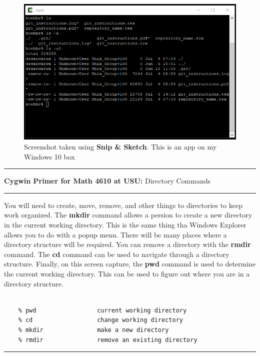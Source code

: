 \documentclass[10pt,fleqn]{article}
\begin{document}
\begin{figure}[h]
\centering
\includegraphics{./images/cygwin_02.png}
\caption{{Screenshot} taken using {\bf Snip \& Sketch}. This is an app on
         my Windows 10 box}
\end{figure}
\eject
\vskip0.1in\hrule\vskip0.1in
\noindent
{{\bf Cygwin Primer for Math 4610 at USU:} Directory Commands} 
\vskip0.1in\hrule\vskip0.1in
\noindent
You will need to create, move, remove, and other things to directories to keep
work organized. The {\bf mkdir} command allows a persion to create a new
directory in the current working directory. This is the same thing tha Windows
Explorer allows you to do with a popup menu. There will be many places where
a directory structure will be required. You can remove a directory with the
{\bf rmdir} command. The {\bf cd} command can be used to navigate through a
directory structure. Finally, on this screen capture, the {\bf pwd} command is
used to determine the current working directory. This can be used to figure out
where you are in a directory structure.
\begin{verbatim}

    % pwd                 current working directory
    % cd                  change working directory
    % mkdir               make a new directory
    % rmdir               remove an existing directory

\end{verbatim}
\vskip0.1in\hrule\vskip0.1in
\vfill
\end{document}
